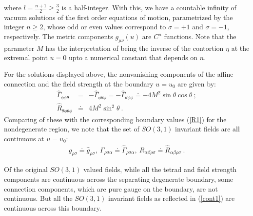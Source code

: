 \documentclass[preprint,aps,superscriptaddress,nofootinbib]{revtex4-1}
\begin{document}
where $l=\frac{n+1}{2}\geq \frac{3}{2}$ is a half-integer.
With this, we have a countable infinity of vacuum solutions of the 
first order equations of motion, parametrized by the integer $n\geq 2$, 
whose odd or even values correspond to $\sigma=+1$ and $\sigma=-1$, 
respectively. The metric components $g_{\mu\nu}(u)$ are $C^{n}$ functions. 
Note that  the parameter $M$ has the interpretation of being the inverse 
of the contortion $\eta$ at the extremal point $u=0$ upto a 
numerical constant that depends on $n$.
 
For the solutions displayed above, the   nonvanishing components of 
the affine connection and the field strength at the boundary $u=u_0$ 
are given by:
\begin{eqnarray}\label{gamma4}
 \hat{\Gamma}_{\phi\phi\theta}&=&-\hat{\Gamma}_{\phi\theta\phi}
=-\hat{\Gamma}_{\theta\phi\phi}\doteq -4M^2 \sin\theta 
\cos\theta~;\nonumber\\
\hat{R}_{\theta\phi \theta\phi}&\doteq& 4M^2\sin^2 \theta~.
\end{eqnarray}
Comparing of these with the corresponding boundary values (\ref{R1}) 
for the nondegenerate region, we note that the set of $SO(3,1)$ invariant 
fields are all continuous at $u=u_0$:
\begin{eqnarray}\label{cont1}
g_{\rho\sigma}\doteq 
\hat{g}_{\rho\sigma},~\Gamma_{\rho\sigma\alpha}\doteq
\hat{\Gamma}_{\rho\sigma\alpha},~
R_{\alpha\beta\rho\sigma}\doteq \hat{R}_{\alpha\beta\rho\sigma}~.
\end{eqnarray}

Of the original $SO(3,1)$ valued fields, while all the tetrad and field
strength components are continuous across the separating degenerate 
boundary, some connection components, which are pure gauge on 
the boundary, are not continuous. 
But all the $SO(3,1)$ invariant fields as reflected in (\ref{cont1}) 
are continuous across this  boundary.
\end{document}
